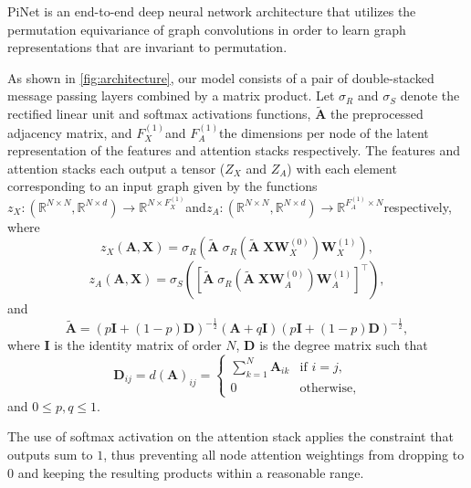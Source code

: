 \documentclass{article}
\renewcommand{\vec}[1]{\mathbf{#1}}
\newcommand{\T}{\top}
\theoremstyle{definition}
\newcommand{\Real}[1]{\mathbb{R}^{#1}}
\begin{document}
PiNet is an end-to-end deep neural network architecture that utilizes the permutation equivariance of graph convolutions in order to learn graph representations that are invariant to permutation.

As shown in \autoref{fig:architecture}, our model consists of a pair of double-stacked message passing layers combined by a matrix product. Let $\sigma_R$ and $\sigma_S$ denote the rectified linear unit and softmax activations functions, $\vec{\tilde{A}}$ the preprocessed adjacency matrix, and \small$F_X^{(1)}$\normalsize and \small$F_A^{(1)}$\normalsize the dimensions per node of the latent representation of the features and attention stacks respectively. The features and attention stacks each output a tensor ($Z_X$ and $Z_A$) with each element corresponding to an input graph given by the functions \small$z_X : (\Real{N \times N}, \Real{N \times d}) \rightarrow \Real{N \times F_X^{(1)}}$\normalsize and\small $z_A : (\Real{N \times N}, \Real{N \times d}) \rightarrow \Real{F_A^{(1)} \times N}$\normalsize respectively, where
\begin{equation}
  z_X(\vec{A}, \vec{X}) = \sigma_R \left(\vec{\tilde{A}} \; \sigma_R \left( \vec{\tilde{A}} \; \vec{X} \vec{W}_X^{(0)} \right) \vec{W}_X^{(1)} \right),
  \label{eq:zx}
\end{equation}
\begin{equation}
  z_A(\vec{A}, \vec{X}) = \sigma_S \left( \left[ \vec{\tilde{A}} \; \sigma_R \left( \vec{\tilde{A}} \; \vec{X} \vec{W}_A^{(0)} \right) \vec{W}_A^{(1)} \right]^\T \right),
  \label{eq:za}
\end{equation}
and
\begin{equation}
  \vec{\tilde{A}} = (p \vec{I} + (1 - p) \vec{D})^{-\frac{1}{2}} (\vec{A} + q \vec{I}) (p \vec{I} + (1 - p) \vec{D})^{-\frac{1}{2}},
  \label{eq:messages}
\end{equation}
where $\vec{I}$ is the identity matrix of order $N$, $\vec{D}$ is the degree matrix such that
\begin{equation}
  \label{eq:deg}
  \vec{D}_{ij} = d(\vec{A})_{ij} =
\left\{
	\begin{array}{ll}
	  \sum_{k=1}^N \vec{A}_{ik}  & \mbox{if } i = j, \\
	  0 & \mbox{otherwise,}
	\end{array}
\right.
\end{equation}
and $0 \le p, q \le 1$.

The use of softmax activation on the attention stack applies the constraint that outputs sum to $1$, thus preventing all node attention weightings from dropping to $0$ and keeping the resulting products within a reasonable range.
\end{document}
